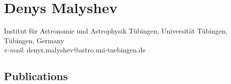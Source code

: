 \documentclass{article} \oddsidemargin -0,05 cm \textwidth
\begin{document}
\section*{ Denys Malyshev}
 \noindent
Institut f{\"u}r Astronomie und Astrophysik T{\"u}bingen, Universit{\"a}t T{\"u}bingen,  T{\"u}bingen, Germany \\
\emph{e-mail}: denys.malyshev@astro.uni-tuebingen.de \\

\subsection*{Publications}

\nocite{*}

\end{document}
